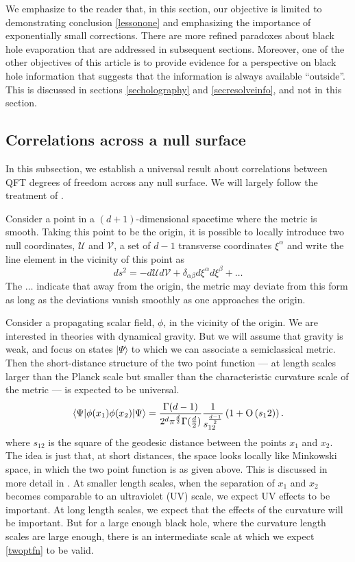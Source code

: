 \documentclass[12pt]{article}
\def\Or[#1]{{\text{O}}\left({#1}\right)}
\newcommand{\be}{\begin{equation}}
\newcommand{\ee}{\end{equation}}
\def\uent{\mathcal{U}}
\def\vent{\mathcal{V}}
\def\xent{\mathcal{\xi}}
\begin{document}
We emphasize to the reader that, in this section, our objective is limited to demonstrating conclusion \ref{lessonone} and emphasizing the importance of exponentially small corrections.
There are more refined paradoxes about black hole evaporation that are addressed in subsequent sections. Moreover, one of the other objectives of this article is to provide evidence for a perspective on black hole information that suggests that the information is always available ``outside''.  This is discussed in sections \ref{secholography} and \ref{secresolveinfo},  and not in this section.



\subsection{Correlations across a null surface \label{corrnull}}

In this subsection, we establish a universal result about correlations between QFT degrees of freedom across any null surface.
We will largely follow the treatment of \cite{Papadodimas:2019msp}.

Consider a point in a $(d+1)$-dimensional spacetime where the metric is smooth. Taking this point to be the origin, it is possible to locally introduce two null coordinates, $\uent$ and $\vent$, a set of $d-1$ transverse coordinates $\xent^{\alpha}$ and write the line element in the vicinity of this point as
\be
\label{nearpatchmetric}
ds^2 = -d \uent d \vent + \delta_{\alpha \beta} d \xent^{\alpha} d \xent^{\beta} + \ldots
\ee
The $\ldots$ indicate that away from the origin, the metric may deviate from this form as long as the deviations vanish smoothly as one approaches the origin.

Consider a propagating scalar field, $\phi$,  in the vicinity of the origin. We are interested in theories with dynamical gravity. But we will assume  that gravity is weak, and focus on states $|\Psi \rangle$ to which we can associate a semiclassical metric. Then the short-distance structure of the two point function --- at length scales larger than the Planck scale but smaller than the characteristic curvature scale of the metric --- is expected to be universal.
\be
\label{twoptfn}
\langle \Psi | \phi(x_1) \phi(x_2) | \Psi \rangle = {\Gamma(d-1) \over 2^d \pi^{d \over2} \Gamma({d \over 2})}  {1 \over s_{12}^{d-1 \over 2}}\left(1 + \Or[s_{12}]\right).
\ee
where $s_{12}$ is the square of the geodesic distance between the points $x_1$ and $x_2$. The idea is just that, at short distances, the space looks locally like Minkowski space, in which the two point function is as given above. This is discussed in more detail in \cite{Papadodimas:2019msp}. At smaller length scales, when the separation of $x_1$ and $x_2$ becomes comparable to an ultraviolet (UV) scale, we expect UV effects to be important. At long length scales, we expect that the effects of the curvature will be important. But for a large enough black hole, where the curvature length scales are large enough, there is an intermediate scale at which we expect \eqref{twoptfn} to be valid.
\end{document}

